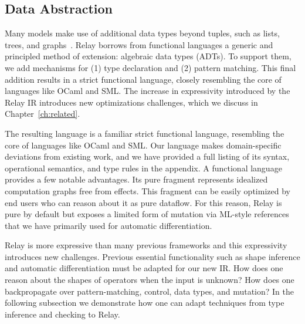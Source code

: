 \subsection{Data Abstraction}
Many models make use of additional data types beyond
  tuples, such as lists, trees, and graphs~\citep{char-rnn, tree_lstm, graph_lstm}.
Relay borrows from functional languages
  a generic and principled method of extension:
  algebraic data types (ADTs).
To support them, we add mechanisms for
  (1) type declaration and
  (2) pattern matching.
This final addition results in a strict functional language,
  closely resembling the core of languages like OCaml and SML.
The increase in expressivity introduced by the Relay IR introduces
  new optimizations challenges, which we
  discuss in Chapter~\ref{ch:related}.

The resulting language is a familiar strict functional language,
  resembling the core of languages like OCaml and SML.
Our language makes domain-specific deviations from existing work,
  and we have provided a full listing
  of its syntax, operational semantics, and type rules
  in the appendix.
A functional language provides a few notable advantages.
Its pure fragment represents idealized computation graphs free
  from effects. This fragment can be easily optimized by end users who
  can reason about it as pure dataflow.
For this reason, Relay is pure by default but exposes a limited
  form of mutation via ML-style references that we have
  primarily used for automatic differentiation.

Relay is more expressive than many previous frameworks and this expressivity introduces new challenges.
  Previous essential functionality such
    as shape inference and automatic differentiation must be adapted for
    our new IR.
How does one reason about the shapes of operators when the input is unknown?
How does one backpropagate over pattern-matching, control, data types, and mutation?
In the following subsection we demonstrate how one can adapt techniques
  from type inference and checking to Relay.


